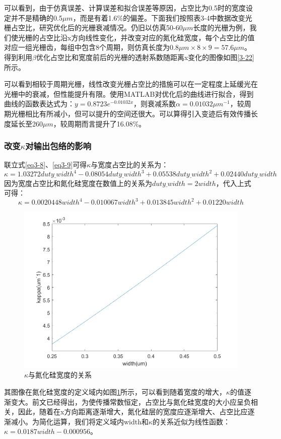 \documentclass[UTF8,a4paper,12pt]{ctexart}
\numberwithin{equation}{section}
\begin{document}
可以看到，由于仿真误差、计算误差和拟合误差等原因，占空比为0.5时的宽度设定并不是精确的0.5$\mu m$，而是有着1.6\%的偏差。下面我们按照表3-4中数据改变光栅占空比，研究优化后的光栅衰减情况。仍旧以仿真50-60$\mu m$长度的光栅为例，我们使光栅的占空比沿x方向线性变化，并改变对应的氮化硅宽度，每个占空比的值对应一组光栅齿，每组中包含8个周期，则仿真长度为$0.8\mu m \times 8 \times 9 = 57.6\mu m$。得到利用$\beta$优化占空比和宽度前后的光栅的透射系数随距离x变化的图像如图\ref{3-22}所示。



可以看到相较于周期光栅，线性改变光栅占空比的措施可以在一定程度上延缓光在光栅中的衰减，但性能提升有限。使用MATLAB对优化后的曲线进行拟合，得到曲线的函数表达式为：$y=0.8723e^{-0.01032x}$，则衰减系数$\alpha=0.01032\mu m^{-1}$，较周期光栅相比有所减小，但可以提升的空间还很大。可以算得引入变迹后有效传播长度延长至260$\mu m$，较周期而言提升了16.08\%。
\subsubsection{改变$\kappa$对输出包络的影响}
\label{sec3-4-2}
联立式\ref{eq3-8}、\ref{eq3-9}可得$\kappa$与宽度占空比的关系为：
$$\kappa=1.03272duty\underline{~}width^4-0.08054duty\underline{~}width^3+0.05538duty\underline{~}width^2+0.02440duty\underline{~}width$$
因为宽度占空比和氮化硅宽度在数值上的关系为$duty\underline{~}width=2width$，代入上式可得：
\begin{equation}
    \kappa=0.0020448width^4-0.010067width^3+0.013845width^2+0.01220width
    \label{eq3-11}
\end{equation}

\begin{figure}[htbp]
\centering
\includegraphics[width=0.8\linewidth]{fig34.png}
\caption{$\kappa$与氮化硅宽度的关系}
\label{3-23}
\end{figure}
\noindent 其图像在氮化硅宽度的定义域内如图\ref{3-23}所示，可以看到随着宽度的增大，$\kappa$的值逐渐变大。前文已经得出，为使传播常数恒定，占空比与氮化硅宽度的大小应呈负相关，因此，随着在x方向距离逐渐增大，氮化硅层的宽度应逐渐增大、占空比应逐渐减小。为简化运算，我们将定义域内width和$\kappa$的关系近似为线性函数：$\kappa=0.0187width-0.000956$。
\end{document}
